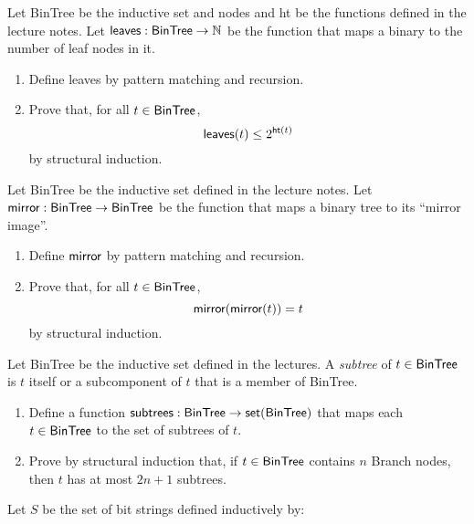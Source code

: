 \documentclass[11pt,fleqn]{article}
\newcommand{\be}{\begin{enumerate}}
\newcommand{\ee}{\end{enumerate}}
\newcommand{\mname}[1]{\mbox{\sf #1}}
\begin{document}
  \item Let \mname{BinTree} be the inductive set and \mname{nodes} and
    \mname{ht} be the functions defined in the lecture notes.  Let
    $\mname{leaves} : \mname{BinTree} \rightarrow \mathbb{N}$ be the
    function that maps a binary to the number of leaf nodes in it.

  \be

    \item Define \mname{leaves} by pattern matching and recursion.

    \item Prove that, for all $t \in
      \mname{BinTree}$, \[\mname{leaves}(t) \le 2^{{\sf ht}(t)}\] by
        structural induction.

  \ee

  \item Let \mname{BinTree} be the inductive set defined in the
    lecture notes.  Let $\mname{mirror} : \mname{BinTree} \rightarrow
    \mname{BinTree}$ be the function that maps a binary tree to its
    ``mirror image''.

  \be

    \item Define $\mname{mirror}$ by pattern matching and recursion.

    \item Prove that, for all $t \in \mname{BinTree}$,
      \[\mname{mirror}(\mname{mirror}(t)) = t\] by structural
      induction.

  \ee

  \item Let \mname{BinTree} be the inductive set defined in the
    lectures.  A \emph{subtree} of $t \in \mname{BinTree}$ is $t$
    itself or a subcomponent of $t$ that is a member of
    \mname{BinTree}.

  \be

    \item Define a function $\mname{subtrees} : \mname{BinTree}
      \rightarrow \mname{set}(\mname{BinTree})$ that maps each $t \in
      \mname{BinTree}$ to the set of subtrees of $t$.

    \item Prove by structural induction that, if $t \in
      \mname{BinTree}$ contains $n$ \mname{Branch} nodes, then $t$
      has at most $2n + 1$ subtrees.

  \ee

  \item Let $S$ be the set of bit strings defined inductively by:
\end{document}
